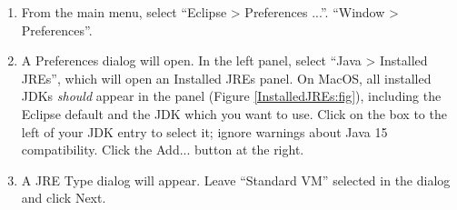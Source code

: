 \begin{enumerate}

\item From the main menu, select 
\ifMacOS
``{\sf Eclipse > Preferences ...}''.
\else
``{\sf Window > Preferences}''.
\fi

\item A {\sf Preferences} dialog will open. In the left panel, select
``{\sf Java > Installed JREs}'', which will open an {\sf Installed JREs}
panel.
\ifMacOS %
On MacOS, all installed JDKs {\it should} appear in the panel
(Figure \ref{InstalledJREs:fig}), including the Eclipse default and
the JDK which you want to use.  Click on the box to the left of
your JDK entry to select it; ignore warnings about Java 15
compatibility.
\else  %
Click the {\sf Add...} button at the right.

\item A {\sf JRE Type} dialog will appear. Leave ``Standard VM''
selected in the dialog and click {\sf Next}.


\end{enumerate}
